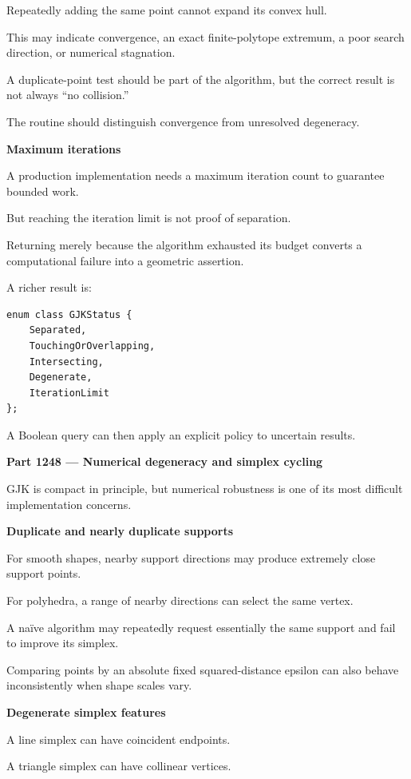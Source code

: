 Repeatedly adding the same point cannot expand its convex hull.

This may indicate convergence, an exact finite-polytope extremum, a poor search direction, or numerical stagnation.

A duplicate-point test should be part of the algorithm, but the correct result is not always ``no collision.''

The routine should distinguish convergence from unresolved degeneracy.

\textbf{Maximum iterations}

A production implementation needs a maximum iteration count to guarantee bounded work.

But reaching the iteration limit is not proof of separation.

Returning  merely because the algorithm exhausted its budget converts a computational failure into a geometric assertion.

A richer result is:

\begin{verbatim}
enum class GJKStatus {
    Separated,
    TouchingOrOverlapping,
    Intersecting,
    Degenerate,
    IterationLimit
};
\end{verbatim}

A Boolean query can then apply an explicit policy to uncertain results.

\textbf{Part 1248 --- Numerical degeneracy and simplex cycling}

GJK is compact in principle, but numerical robustness is one of its most difficult implementation concerns.

\textbf{Duplicate and nearly duplicate supports}

For smooth shapes, nearby support directions may produce extremely close support points.

For polyhedra, a range of nearby directions can select the same vertex.

A naïve algorithm may repeatedly request essentially the same support and fail to improve its simplex.

Comparing points by an absolute fixed squared-distance epsilon can also behave inconsistently when shape scales vary.

\textbf{Degenerate simplex features}

A line simplex can have coincident endpoints.

A triangle simplex can have collinear vertices.

